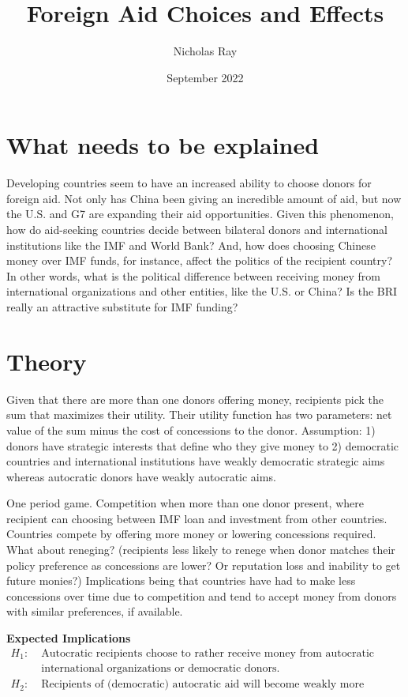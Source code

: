 \documentclass{article}
\title{Foreign Aid Choices and Effects}
\author{Nicholas Ray}
\date{September 2022}
\begin{document}
\maketitle
\section*{What needs to be explained} 
Developing countries seem to have an increased ability to choose donors for foreign aid. Not only has China been giving an incredible amount of aid, but now the U.S. and G7 are expanding their aid opportunities. Given this phenomenon, how do aid-seeking countries decide between bilateral donors and international institutions like the IMF and World Bank? And, how does choosing Chinese money over IMF funds, for instance, affect the politics of the recipient country? In other words, what is the political difference between receiving money from international organizations and other entities, like the U.S. or China? Is the BRI really an attractive substitute for IMF funding?

\section*{Theory} 
Given that there are more than one donors offering money, recipients pick the sum that maximizes their utility. Their utility function has two parameters: net value of the sum minus the cost of concessions to the donor. Assumption: 1) donors have strategic interests that define who they give money to 2) democratic countries and international institutions have weakly democratic strategic aims whereas autocratic donors have weakly autocratic aims. 

One period game. Competition when more than one donor present, where recipient can choosing between IMF loan and investment from other countries. Countries compete by offering more money or lowering concessions required. What about reneging? (recipients less likely to renege when donor matches their policy preference as concessions are lower? Or reputation loss and inability to get future monies?)  Implications being that countries have had to make less concessions over time due to competition and tend to accept money from donors with similar preferences, if available.

\textbf{Expected Implications} 
\begin{align*}
    H_1:\; &\text{Autocratic recipients choose to rather receive money from autocratic donors than}\\
    &\text{international organizations or democratic donors.}\\
    H_2:\; &\text{Recipients of (democratic) autocratic aid will become weakly more (democratic) autocratic.}
\end{align*}
\end{document}

